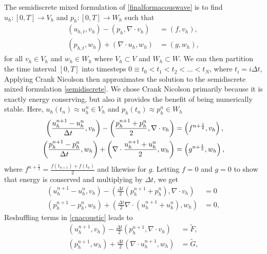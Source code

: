 \documentclass[11pt]{article}
\begin{document}
The semidiscrete mixed formulation of \eqref{finalformacouswave} is to find $u_h:[0,T] \rightarrow V_h$ and $p_h:[0,T] \rightarrow W_h$ such that
\begin{equation}\label{semidiscrete}
\begin{split}
(u_{h,t},v_h) - (p_h,\nabla \cdot v_h) &= (f,v_h),\\
(p_{h,t}, w_h) + (\nabla \cdot u_h,w_h) &= (g,w_h),
\end{split}
\end{equation}
for all $v_h \in V_h$ and $w_h \in W_h$ where $V_h \subset V$ and $W_h \subset W$.
We can then partition the time interval $[0,T]$ into timesteps $0 \equiv t_0 < t_1 < t_2 < ... < t_N$, where $t_i = i\Delta t$, %
Applying Crank Nicolson then approximates the solution to the semidiscrete mixed formulation \eqref{semidiscrete}. We chose Crank Nicolson primarily because it is exactly energy conserving, but also it provides the benefit of being numerically stable. Here, $u_h(t_n) \approx u^n_h \in V_h$ and $p_h(t_n) \approx p^n_h \in W_h$
\begin{equation}{\label{cnacoustic}}
\begin{split}
\left(\frac{u^{n+1}_h-u^n_h}{\Delta t},v_h\right)-\left(\frac{p^{n+1}_h+p^n_h}{2},\nabla \cdot v_h\right) &= \left(f^{n+\frac{1}{2}},v_h\right), \\
\left(\frac{p^{n+1}_h-p^n_h}{\Delta t},w_h\right)+\left(\nabla \cdot \frac{u^{n+1}_h+u^n_h}{2},w_h\right) &= \left(g^{n+\frac{1}{2}},w_h\right),
\end{split}
\end{equation}
where $f^{n+\frac{1}{2}} = \frac{f(t_{n+1})+f(t_n)}{2}$ and likewise for $g$. Letting $f = 0$ and $g=0$ to show that energy is conserved and multiplying by $\Delta t$, we get
\begin{equation}
\begin{split}
\left(u^{n+1}_h-u^n_h,v_h\right)-\left(\frac{\Delta t}{2}\left(p^{n+1}_h+p^n_h\right),\nabla \cdot v_h\right) &= 0 \\
\left(p^{n+1}_h-p^n_h,w_h\right)+\left(\frac{\Delta t}{2}\nabla \cdot\left(u^{n+1}_h+u^n_h\right),w_h\right) &= 0,
\end{split}
\end{equation}
Reshuffling terms in \eqref{cnacoustic} leads to 
\begin{equation}\label{discretizationfinal}
\begin{split}
\left(u^{n+1}_h,v_h\right) - \frac{\Delta t}{2}\left(p^{n+1}_h, \nabla \cdot v_h\right) &= \tilde{F}, \\
\left(p^{n+1}_h,w_h\right) + \frac{\Delta t}{2}\left(\nabla \cdot u^{n+1}_h,w_h\right) &= \tilde{G},
\end{split}
\end{equation}
\end{document}
